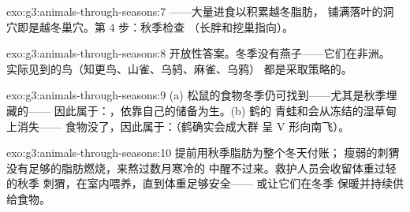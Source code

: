 \begin{solution}{exo:g3:animals-through-seasons:7}
——大量进食以积累越冬脂肪，
铺满落叶的洞穴即是越冬巢穴。第 4 步：秋季检查
（长胖和挖巢指向）。
\end{solution}

\begin{solution}{exo:g3:animals-through-seasons:8}
开放性答案。冬季没有燕子——它们在非洲。
实际见到的鸟（知更鸟、山雀、乌鸫、麻雀、乌鸦）
都是采取策略的。
\end{solution}

\begin{solution}{exo:g3:animals-through-seasons:9}
(a) 松鼠的食物冬季仍可找到——尤其是秋季埋藏的——
因此属于：，依靠自己的储备为生。(b) 鹤的
青蛙和会从冻结的湿草甸上消失——
食物没了，因此属于：（鹤确实会成大群
呈 V 形向南飞）。
\end{solution}

\begin{solution}{exo:g3:animals-through-seasons:10}
提前用秋季脂肪为整个冬天付账；
瘦弱的刺猬没有足够的脂肪燃烧，来熬过数月寒冷的
中醒不过来。救护人员会收留体重过轻的秋季
刺猬，在室内喂养，直到体重足够安全——
或让它们在冬季
保暖并持续供给食物。
\end{solution}

